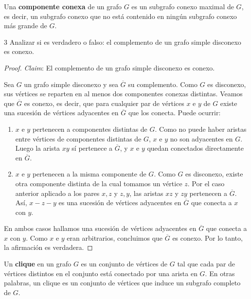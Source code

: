 \begin{definition}\label{def:componente-conexa}
    Una \textbf{componente conexa} de un grafo \( G \) es un subgrafo conexo maximal de \( G \), es decir, un subgrafo conexo que no está contenido en ningún subgrafo conexo más grande de \( G \).
\end{definition}

\begin{ejercicioEntregar}{3}
    Analizar si es verdadero o falso: el complemento de un grafo simple disconexo es conexo.
\end{ejercicioEntregar}
\begin{proof}
    \emph{Claim}: El complemento de un grafo simple disconexo es conexo.

    Sea \( G \) un grafo simple disconexo y sea \( \overline{G} \) su complemento. Como \( G \) es disconexo, sus vértices se reparten en al menos dos componentes conexas distintas. Veamos que \( \overline{G} \) es conexo, es decir, que para cualquier par de vértices \( x \) e \( y \) de \( G \) existe una sucesión de vértices adyacentes en \( \overline{G} \) que los conecta. Puede ocurrir:
    \begin{enumerate}
        \item \( x \) e \( y \) pertenecen a componentes distintas de \( G \). Como no puede haber aristas entre vértices de componentes distintas de \( G \), \( x \) e \( y \) no son adyacentes en \( G \). Luego la arista \( xy \) sí pertenece a \( \overline{G} \), y \( x \) e \( y \) quedan conectados directamente en \( \overline{G} \).
        \item \( x \) e \( y \) pertenecen a la misma componente de \( G \). Como \( G \) es disconexo, existe otra componente distinta de la cual tomamos un vértice \( z \). Por el caso anterior aplicado a los pares \( x,z \) y \( z,y \), las aristas \( xz \) y \( zy \) pertenecen a \( \overline{G} \). Así, \( x - z - y \) es una sucesión de vértices adyacentes en \( \overline{G} \) que conecta a \( x \) con \( y \).
    \end{enumerate}
    En ambos casos hallamos una sucesión de vértices adyacentes en \( \overline{G} \) que conecta a \( x \) con \( y \). Como \( x \) e \( y \) eran arbitrarios, concluimos que \( \overline{G} \) es conexo. Por lo tanto, la afirmación es verdadera.
\end{proof}

\vspace{0.5cm}

\begin{definition}
    Un \textbf{clique} en un grafo \( G \) es un conjunto de vértices de \( G \) tal que cada par de vértices distintos en el conjunto está conectado por una arista en \( G \). En otras palabras, un clique es un conjunto de vértices que induce un subgrafo completo de \( G \).
\end{definition}


